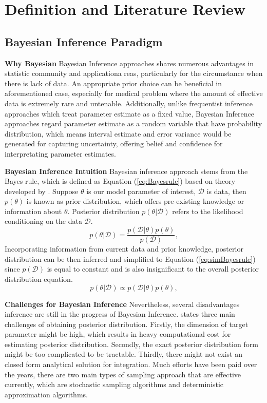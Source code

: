 \chapter{Definition and Literature Review}
\label{Chapter2}
\section{Bayesian Inference Paradigm}
\textbf{Why Bayesian}
Bayesian Inference approaches shares numerous advantages in statistic community and applicationa reas, particularly for the circumstance when there is lack of data. An appropriate prior choice can be beneficial in aforementioned case, especially for medical problem where the amount of effective data is extremely rare and untenable. Additionally, unlike frequentist inference approaches which treat parameter estimate as a fixed value, Bayesian Inference approaches regard parameter estimate as a random variable that have probability distribution, which means interval estimate and error variance would be generated for capturing uncertainty, offering  belief and confidence for interpretating parameter estimates.

\textbf{Bayesian Inference Intuition}
Bayesian inference approach stems from the Bayes rule, which is defined as Equation (\ref{eq:Bayesrule}) based on theory developed by \cite{Beech1959}. Suppose $\theta$ is our model parameter of interest, $\mathcal{D}$ is data, then $p(\theta)$ is known as prior distribution, which offers pre-existing knowledge or information about $\theta$. Posterior distribution $p(\theta|\mathcal{D})$ refers to the likelihood conditioning on the data $\mathcal{D}$.
\begin{equation}
	p(\theta|\mathcal{D}) = \frac{p(\mathcal{D}|\theta)p(\theta)}{p(\mathcal{D})},
	\label{eq:Bayesrule}
\end{equation}
Incorporating information from current data and prior knowledge, posterior distribution can be then inferred and simplified to Equation (\ref{eq:simBayesrule}) since $p(\mathcal{D})$ is equal to constant and is also insignificant to the overall posterior distribution equation.
\begin{equation}
	p(\theta|\mathcal{D}) \propto p(\mathcal{D}|\theta)p(\theta),
	\label{eq:simBayesrule}
\end{equation}

\textbf{Challenges for Bayesian Inference}
Nevertheless, several disadvantages inference are still in the progress of Bayesian Inference. \cite{bishop_2006} states three main challenges of obtaining posterior distribution. Firstly, the dimension of target parameter might be high, which results in heavy computational cost for estimating posterior distribution. Secondly, the exact posterior distribution form might be too complicated to be tractable. Thirdly, there might not exist an closed form analytical solution for integration. Much efforts have been paid over the years, there are two main types of sampling approach that are effective currently, which are stochastic sampling algorithms and deterministic approximation algorithms. 


